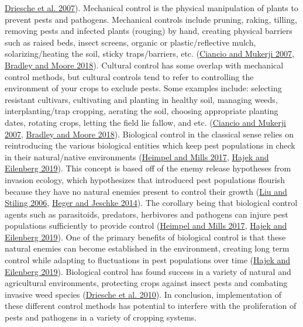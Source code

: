 \documentclass{ufdissertation}[overrideChapters] %
\begin{document}
{\protect\hyperlink{ref-Driesche2007}{Driesche et al. 2007}). Mechanical control is the physical manipulation of plants to prevent pests and pathogens. Mechanical controls include pruning, raking, tilling, removing pests and infected plants (rouging) by hand, creating physical barriers such as raised beds, insect screens, organic or plastic/reflective mulch, solarizing/heating the soil, sticky traps/barriers, etc. (\protect\hyperlink{ref-Ciancio2007}{Ciancio and Mukerji 2007}, \protect\hyperlink{ref-Bradley2018}{Bradley and Moore 2018}). Cultural control has some overlap with mechanical control methods, but cultural controls tend to refer to controlling the environment of your crops to exclude pests. Some examples include: selecting resistant cultivars, cultivating and planting in healthy soil, managing weeds, interplanting/trap cropping, aerating the soil, choosing appropriate planting dates, rotating crops, letting the field lie fallow, and etc. (\protect\hyperlink{ref-Ciancio2007}{Ciancio and Mukerji 2007}, \protect\hyperlink{ref-Bradley2018}{Bradley and Moore 2018}). Biological control in the classical sense relies on reintroducing the various biological entities which keep pest populations in check in their natural/native environments (\protect\hyperlink{ref-Heimpel2017}{Heimpel and Mills 2017}, \protect\hyperlink{ref-Hajek2019}{Hajek and Eilenberg 2019}). This concept is based off of the enemy release hypotheses from invasion ecology, which hypothesizes that introduced pest populations flourish because they have no natural enemies present to control their growth (\protect\hyperlink{ref-Liu2006}{Liu and Stiling 2006}, \protect\hyperlink{ref-Heger2014}{Heger and Jeschke 2014}). The corollary being that biological control agents such as parasitoids, predators, herbivores and pathogens can injure pest populations sufficiently to provide control (\protect\hyperlink{ref-Heimpel2017}{Heimpel and Mills 2017}, \protect\hyperlink{ref-Hajek2019}{Hajek and Eilenberg 2019}). One of the primary benefits of biological control is that these natural enemies can become established in the environment, creating long term control while adapting to fluctuations in pest populations over time (\protect\hyperlink{ref-Hajek2019}{Hajek and Eilenberg 2019}). Biological control has found success in a variety of natural and agricultural environments, protecting crops against insect pests and combating invasive weed species (\protect\hyperlink{ref-Driesche2010}{Driesche et al. 2010}). In conclusion, implementation of these different control methods has potential to interfere with the proliferation of pests and pathogens in a variety of cropping systems.
\begin{figure}


\end{figure}}
\end{document}
